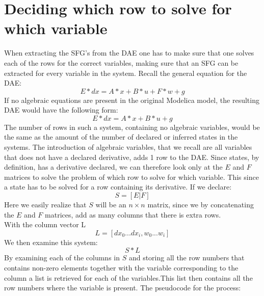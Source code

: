 
\section{Deciding which row to solve for which variable}
When extracting the SFG's from the DAE one has to make sure that one solves each of the rows for the correct variables, making sure that an SFG can be extracted for every variable in the system. Recall the general equation for the DAE:
\begin{equation}
E*dx = A*x + B*u + F*w + g
\end{equation}
If no algebraic equations are present in the original Modelica model, the resulting DAE would have the following form:
\begin{equation}
E*dx = A*x + B*u + g
\end{equation}
The number of rows in such a system, containing no algebraic variables, would be the same as the amount of the number of declared or inferred states in the systems. The introduction of algebraic variables, that we recall are all variables that does not have a declared derivative, adds 1 row to the DAE. Since states, by definition, has a derivative declared, we can therefore look only at the $E$ and $F$ matrices to solve the problem of which row to solve for which variable. This since a state has to be solved for a row containing its derivative. If we declare:
\begin{equation}
S=[E|F]
\end{equation}
Here we easily realize that $S$ will be an $n \times n$ matrix, since we by concatenating the $E$ and $F$ matrices, add as many columns that there is extra rows.\\
With the column vector L
\begin{equation}
L=[dx_0...dx_i, w_0...w_i]
\end{equation}
We then examine this system:
\begin{equation}
S*L
\end{equation}
By examining each of the columns in $S$ and storing all the row numbers that contains non-zero elements together with the variable corresponding to the column a list is retrieved for each of the variables.This  list then contains all the row numbers where the variable is present.
The pseudocode for the process:

